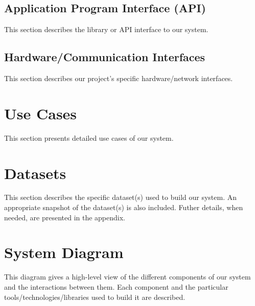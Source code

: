 \subsection{Application Program Interface (API)}
This section describes the library or API interface to our system.

\subsection{Hardware/Communication Interfaces}
This section describes our project's specific hardware/network interfaces.

\section{Use Cases}
This section presents detailed use cases of our system.

\section{Datasets}
This section describes the specific dataset(s) used to build our system. An appropriate snapshot of the dataset(s) is also included. Futher details, when needed, are presented in the appendix.

\section{System Diagram}
This diagram gives a high-level view of the different components of our system and the interactions between them. Each component and the particular tools/technologies/libraries used to build it are described.
